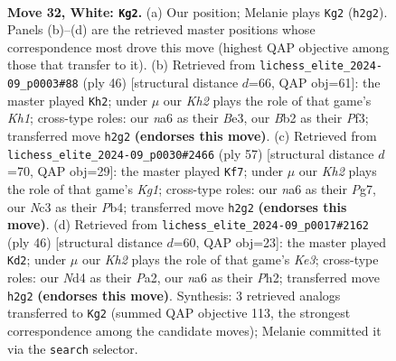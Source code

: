 \documentclass[11pt]{article}
\begin{document}
\clearpage

\begin{figure}[p]\centering
\begin{subfigure}{0.46\textwidth}\centering
\resizebox{\linewidth}{!}{%
\newchessgame
\chessboard[
  setfen={r5r1/1p1kbb1p/n5pP/p2pPp2/P2N4/2N3P1/1B5K/R4R2 w - - 7 32},
  showmover=false,
  pgfstyle=straightmove, color=movearrow, markmove={h2-g2}
]}
\caption{}
\end{subfigure}\hfill
\begin{subfigure}{0.46\textwidth}\centering
\resizebox{\linewidth}{!}{%
\newchessgame
\chessboard[
  setfen={5rk1/4b2p/p2rpnp1/1p6/2pP3P/2N1BP2/PP3P2/R5RK w - - 0 24},
  showmover=false,
  pgfstyle=straightmove, color=movearrow, markmove={h1-h2}
]}
\caption{}
\end{subfigure}
\\[4pt]
\begin{subfigure}{0.46\textwidth}\centering
\resizebox{\linewidth}{!}{%
\newchessgame
\chessboard[
  setfen={2r3k1/6p1/1b1p3p/n1rPp3/Pp2B2P/5P2/1PP1K1P1/2RR4 b - - 0 29},
  showmover=false,
  pgfstyle=straightmove, color=movearrow, markmove={g8-f7}
]}
\caption{}
\end{subfigure}\hfill
\begin{subfigure}{0.46\textwidth}\centering
\resizebox{\linewidth}{!}{%
\newchessgame
\chessboard[
  setfen={2r5/2rbkppp/p3p3/4P3/1PpN1P2/2R1K3/P5PP/2R5 w - - 0 24},
  showmover=false,
  pgfstyle=straightmove, color=movearrow, markmove={e3-d2}
]}
\caption{}
\end{subfigure}
\caption{\textbf{Move 32, White: \texttt{Kg2}.} (a) Our position; Melanie plays \texttt{Kg2} (\texttt{h2g2}). Panels (b)--(d) are the retrieved master positions whose correspondence most drove this move (highest QAP objective among those that transfer to it). (b) Retrieved from \texttt{lichess\_elite\_2024-09\_p0003\#88} (ply 46) [structural distance $d$=66, QAP obj=61]: the master played \texttt{Kh2}; under $\mu$ our \emph{Kh2} plays the role of that game's \emph{Kh1}; cross-type roles: our \emph{n}a6 as their \emph{B}e3, our \emph{B}b2 as their \emph{P}f3; transferred move \texttt{h2g2} \textbf{(endorses this move)}. (c) Retrieved from \texttt{lichess\_elite\_2024-09\_p0030\#2466} (ply 57) [structural distance $d$=70, QAP obj=29]: the master played \texttt{Kf7}; under $\mu$ our \emph{Kh2} plays the role of that game's \emph{Kg1}; cross-type roles: our \emph{n}a6 as their \emph{P}g7, our \emph{N}c3 as their \emph{P}b4; transferred move \texttt{h2g2} \textbf{(endorses this move)}. (d) Retrieved from \texttt{lichess\_elite\_2024-09\_p0017\#2162} (ply 46) [structural distance $d$=60, QAP obj=23]: the master played \texttt{Kd2}; under $\mu$ our \emph{Kh2} plays the role of that game's \emph{Ke3}; cross-type roles: our \emph{N}d4 as their \emph{P}a2, our \emph{n}a6 as their \emph{P}h2; transferred move \texttt{h2g2} \textbf{(endorses this move)}. Synthesis: 3 retrieved analogs transferred to \texttt{Kg2} (summed QAP objective 113, the strongest correspondence among the candidate moves); Melanie committed it via the \texttt{search} selector.}
\label{fig:thought-m62}
\end{figure}
\end{document}
